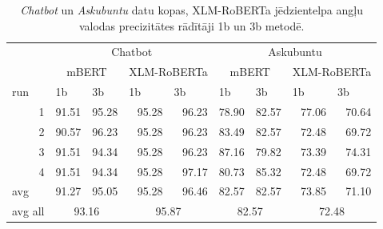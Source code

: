 \begin{table}[htbp]
  \centering
  \caption{\textit{Chatbot} un \textit{Askubuntu} datu kopas, XLM-RoBERTa jēdzientelpa angļu valodas precizitātes rādītāji 1b un 3b metodē.}
    \begin{tabular}{lcc|cc|cc|cc}\toprule
          & \multicolumn{4}{c}{Chatbot}   & \multicolumn{4}{c}{Askubuntu} \\
          & \multicolumn{2}{c}{mBERT} & \multicolumn{2}{c}{XLM-RoBERTa} & \multicolumn{2}{c}{mBERT} & \multicolumn{2}{c}{XLM-RoBERTa} \\
    run   & \multicolumn{1}{l}{1b} & \multicolumn{1}{l}{3b} & \multicolumn{1}{l}{1b} & \multicolumn{1}{l}{3b} & \multicolumn{1}{l}{1b} & \multicolumn{1}{l}{3b} & \multicolumn{1}{l}{1b} & \multicolumn{1}{l}{3b} \\\midrule
    \multicolumn{1}{r}{1} & \multicolumn{1}{r}{91.51} & \multicolumn{1}{r}{95.28} & \multicolumn{1}{r}{95.28} & \multicolumn{1}{r}{96.23} & \multicolumn{1}{r}{78.90} & \multicolumn{1}{r}{82.57} & \multicolumn{1}{r}{77.06} & \multicolumn{1}{r}{70.64} \\
    \multicolumn{1}{r}{2} & \multicolumn{1}{r}{90.57} & \multicolumn{1}{r}{96.23} & \multicolumn{1}{r}{95.28} & \multicolumn{1}{r}{96.23} & \multicolumn{1}{r}{83.49} & \multicolumn{1}{r}{82.57} & \multicolumn{1}{r}{72.48} & \multicolumn{1}{r}{69.72} \\
    \multicolumn{1}{r}{3} & \multicolumn{1}{r}{91.51} & \multicolumn{1}{r}{94.34} & \multicolumn{1}{r}{95.28} & \multicolumn{1}{r}{96.23} & \multicolumn{1}{r}{87.16} & \multicolumn{1}{r}{79.82} & \multicolumn{1}{r}{73.39} & \multicolumn{1}{r}{74.31} \\
    \multicolumn{1}{r}{4} & \multicolumn{1}{r}{91.51} & \multicolumn{1}{r}{94.34} & \multicolumn{1}{r}{95.28} & \multicolumn{1}{r}{97.17} & \multicolumn{1}{r}{80.73} & \multicolumn{1}{r}{85.32} & \multicolumn{1}{r}{72.48} & \multicolumn{1}{r}{69.72} \\\midrule
    avg   & \multicolumn{1}{r}{91.27} & \multicolumn{1}{r}{95.05} & \multicolumn{1}{r}{95.28} & \multicolumn{1}{r}{96.46} & \multicolumn{1}{r}{82.57} & \multicolumn{1}{r}{82.57} & \multicolumn{1}{r}{73.85} & \multicolumn{1}{r}{71.10} \\
    avg all & \multicolumn{2}{c}{93.16} & \multicolumn{2}{c}{95.87} & \multicolumn{2}{c}{82.57} & \multicolumn{2}{c}{72.48} \\\bottomrule
    \end{tabular}%
  \label{tab:13b}%
\end{table}%





